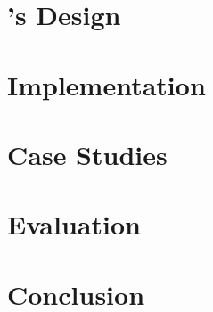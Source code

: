 \documentclass[11pt,twoside,final,natbib=false]{mitthesis}
\begin{document}
\chapter{\sys's Design}%
\label{ch:design}


\chapter{Implementation}%
\label{ch:impl}


\chapter{Case Studies}%
\label{ch:case_studies}


\chapter{Evaluation}%
\label{ch:eval}


\chapter{Conclusion}%
\label{ch:conclusion}



\printbibliography

%
\end{document}
